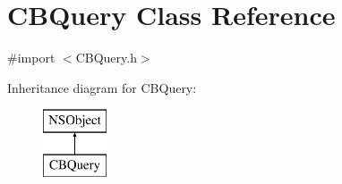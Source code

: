 \hypertarget{interface_c_b_query}{\section{C\-B\-Query Class Reference}
\label{interface_c_b_query}
}


{\ttfamily \#import $<$C\-B\-Query.\-h$>$}

Inheritance diagram for C\-B\-Query\-:\begin{figure}[H]
\begin{center}
\leavevmode
\includegraphics[height=2.000000cm]{interface_c_b_query}
\end{center}
\end{figure}
